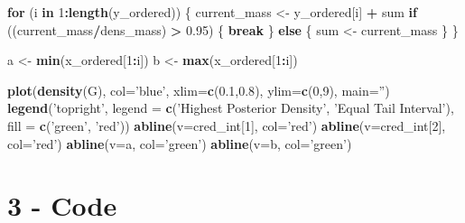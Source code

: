 \documentclass[]{article}
\newenvironment{Shaded}{\begin{snugshade}}{\end{snugshade}}
\newcommand{\KeywordTok}[1]{\textcolor[rgb]{0.13,0.29,0.53}{\textbf{#1}}}
\newcommand{\DataTypeTok}[1]{\textcolor[rgb]{0.13,0.29,0.53}{#1}}
\newcommand{\DecValTok}[1]{\textcolor[rgb]{0.00,0.00,0.81}{#1}}
\newcommand{\FloatTok}[1]{\textcolor[rgb]{0.00,0.00,0.81}{#1}}
\newcommand{\StringTok}[1]{\textcolor[rgb]{0.31,0.60,0.02}{#1}}
\newcommand{\ControlFlowTok}[1]{\textcolor[rgb]{0.13,0.29,0.53}{\textbf{#1}}}
\newcommand{\OperatorTok}[1]{\textcolor[rgb]{0.81,0.36,0.00}{\textbf{#1}}}
\newcommand{\NormalTok}[1]{#1}
\begin{document}
\begin{Shaded}
\begin{Highlighting}[]
\ControlFlowTok{for}\NormalTok{ (i }\ControlFlowTok{in} \DecValTok{1}\OperatorTok{:}\KeywordTok{length}\NormalTok{(y_ordered)) \{}
\NormalTok{  current_mass <-}\StringTok{ }\NormalTok{y_ordered[i] }\OperatorTok{+}\StringTok{ }\NormalTok{sum}
  \ControlFlowTok{if}\NormalTok{ ((current_mass}\OperatorTok{/}\NormalTok{dens_mass) }\OperatorTok{>}\StringTok{ }\FloatTok{0.95}\NormalTok{) \{}
    \ControlFlowTok{break}
\NormalTok{  \} }\ControlFlowTok{else}\NormalTok{ \{}
\NormalTok{    sum <-}\StringTok{ }\NormalTok{current_mass}
\NormalTok{  \}}
\NormalTok{\}}

\NormalTok{a <-}\StringTok{ }\KeywordTok{min}\NormalTok{(x_ordered[}\DecValTok{1}\OperatorTok{:}\NormalTok{i])}
\NormalTok{b <-}\StringTok{ }\KeywordTok{max}\NormalTok{(x_ordered[}\DecValTok{1}\OperatorTok{:}\NormalTok{i])}

\KeywordTok{plot}\NormalTok{(}\KeywordTok{density}\NormalTok{(G), }
     \DataTypeTok{col=}\StringTok{'blue'}\NormalTok{, }
     \DataTypeTok{xlim=}\KeywordTok{c}\NormalTok{(}\FloatTok{0.1}\NormalTok{,}\FloatTok{0.8}\NormalTok{), }
     \DataTypeTok{ylim=}\KeywordTok{c}\NormalTok{(}\DecValTok{0}\NormalTok{,}\DecValTok{9}\NormalTok{),}
     \DataTypeTok{main=}\StringTok{''}\NormalTok{)}
\KeywordTok{legend}\NormalTok{(}\StringTok{'topright'}\NormalTok{,}
       \DataTypeTok{legend =} \KeywordTok{c}\NormalTok{(}\StringTok{'Highest Posterior Density'}\NormalTok{, }\StringTok{'Equal Tail Interval'}\NormalTok{),}
       \DataTypeTok{fill =} \KeywordTok{c}\NormalTok{(}\StringTok{'green'}\NormalTok{, }\StringTok{'red'}\NormalTok{))}
\KeywordTok{abline}\NormalTok{(}\DataTypeTok{v=}\NormalTok{cred_int[}\DecValTok{1}\NormalTok{], }\DataTypeTok{col=}\StringTok{'red'}\NormalTok{)}
\KeywordTok{abline}\NormalTok{(}\DataTypeTok{v=}\NormalTok{cred_int[}\DecValTok{2}\NormalTok{], }\DataTypeTok{col=}\StringTok{'red'}\NormalTok{)}
\KeywordTok{abline}\NormalTok{(}\DataTypeTok{v=}\NormalTok{a, }\DataTypeTok{col=}\StringTok{'green'}\NormalTok{)}
\KeywordTok{abline}\NormalTok{(}\DataTypeTok{v=}\NormalTok{b, }\DataTypeTok{col=}\StringTok{'green'}\NormalTok{)}
\end{Highlighting}
\end{Shaded}

\newpage

\section{3 - Code}\label{code-2}
\end{document}
